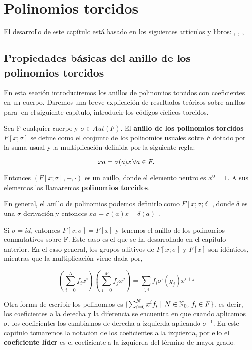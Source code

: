 
\chapter{Polinomios torcidos}


El desarrollo de este capítulo está basado en los siguientes artículos y libros: \cite{CodingTheory}, \cite{Jacobson1996}, \cite{Ore1993}, \cite{alon2020structure}


\section{Propiedades básicas del anillo de los polinomios torcidos}


En esta sección introduciremos los anillos de polinomios torcidos con coeficientes en un cuerpo. Daremos una breve explicación de resultados teóricos sobre anillos para, en el siguiente capítulo, introducir los códigos cíclicos torcidos.

\begin{definition}
Sea F cualquier cuerpo y $\sigma \in Aut(F)$. El \textbf{anillo de los polinomios torcidos } $F[x;\sigma]$ se define como el conjunto de los polinomios usuales sobre $F$ dotado por la suma usual y la multiplicación definida por la siguiente regla:

\[ xa = \sigma(a)x \thinspace \forall a \in F . \]

Entonces $(F[x;\sigma],+,\cdot)$ es un anillo, donde el elemento neutro es $x^0 = 1$. A sus elementos los llamaremos \textbf{polinomios torcidos}.
\end{definition}

\begin{remark}
En general, el anillo de polinomios podemos definirlo como $F[x;\sigma;\delta]$, donde $\delta$ es una $\sigma$-derivación y entonces  $ xa = \sigma(a)x + \delta(a)$ . 
\end{remark}

Si $\sigma = id$, entonces $F[x;\sigma] = F[x]$ y tenemos el anillo de los polinomios conmutativos sobre F. Este caso es el que se ha desarrollado en el capítulo anterior. En el caso general, los grupos aditivos de $F[x;\sigma]$ y $F[x]$ son idénticos, mientras que la multiplicación viene dada por,


\[ (\sum_{i=0}^N f_ix^i)(\sum_{j=0}^M f_jx^j) = \sum_{i,j} f_i\sigma^i(g_j)x^{i+j}  \]

Otra forma de escribir los polinomios es $\{ \sum_{i=0}^N x^if_i \mid \thinspace N \in \mathbb{N}_0 , \thinspace f_i \in F \}$, es decir, los coeficientes a la derecha y la diferencia se encuentra en que cuando aplicamos $\sigma$, los coeficientes los cambiamos de derecha a izquierda aplicando $\sigma^{-1}$. En este capítulo tomaremos la notación de los coeficientes a la izquierda, por ello el \textbf{coeficiente líder} es el coeficiente a la izquierda del término de mayor grado.

